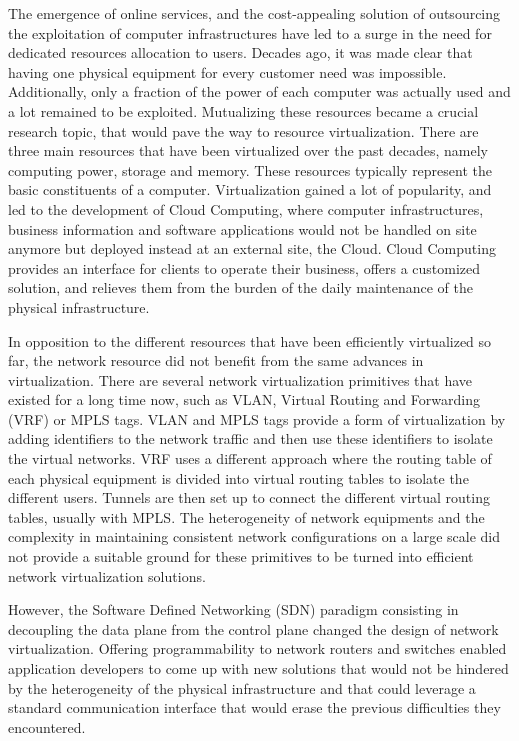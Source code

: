 The emergence of online services, and the cost-appealing solution of outsourcing the exploitation of computer infrastructures have led to a surge in the need for dedicated resources allocation to users. Decades ago, it was made clear that having one physical equipment for every customer need was impossible. Additionally, only a fraction of the power of each computer was actually used and a lot remained to be exploited.
Mutualizing these resources became a crucial research topic, that would pave the way to resource virtualization. 
There are three main resources that have been virtualized over the past decades, namely computing power, storage and memory.
These resources typically represent the basic constituents of a computer.
Virtualization gained a lot of popularity, and led to the development of Cloud Computing, where computer infrastructures, business information and software applications would not be handled on site anymore but deployed instead at an external site, \ie the Cloud. 
Cloud Computing provides an interface for clients to operate their business, offers a customized solution, and relieves them from the burden of the daily maintenance of the physical infrastructure.

In opposition to the different resources that have been efficiently virtualized so far, the network resource did not benefit from the same advances in virtualization.
There are several network virtualization primitives that have existed for a long time now, such as VLAN, Virtual Routing and Forwarding (VRF) or MPLS tags. VLAN and MPLS tags provide a form of virtualization by adding identifiers to the network traffic and then use these identifiers to isolate the virtual networks. VRF uses a different approach where the routing table of each physical equipment is divided into virtual routing tables to isolate the different users. Tunnels are then set up to connect the different virtual routing tables, usually with MPLS.
The heterogeneity of network equipments and the complexity in maintaining consistent network configurations on a large scale did not provide a suitable ground for these primitives to be turned into efficient network virtualization solutions.

However, the Software Defined Networking (SDN) paradigm consisting in decoupling the data plane from the control plane changed the design of network virtualization. Offering programmability to network routers and switches enabled application developers to come up with new solutions that would not be hindered by the heterogeneity of the physical infrastructure and that could leverage a standard communication interface that would erase the previous difficulties they encountered.

